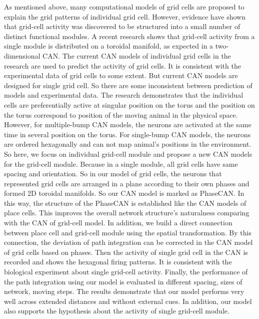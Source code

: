 \documentclass[final,5p,times,twocolumn,authoryear]{elsarticle}
\begin{document}
As mentioned above, many computational models of grid cells are proposed to explain the grid patterns of individual grid cell. However, evidence have shown that grid-cell activity was discovered to be structured into a small number of distinct functional modules\citep{Stensola2012}. A recent research shows that grid-cell activity from a single module is distributed on a toroidal manifold, as expected in a two-dimensional CAN\citep{Gardner2022}. The current CAN models\citep{Fuhs2006,Burak2009,Guanella2007} of individual grid cells in the research are used to predict the activity of grid cells. It is consistent with the experimental data of grid cells to some extent. But current CAN models are designed for single grid cell. So there are some inconsistent between prediction of models and experimental data. The research demonstrates that the individual cells are preferentially active at singular position on the torus and the position on the torus correspond to position of the moving animal in the physical space\citep{Gardner2022}. However, for multiple-bump CAN models, the neurons are activated at the same time in several position on the torus. For single-bump CAN models, the neurons are ordered hexagonally and can not map animal's positions in the environment. So here, we focus on individual grid-cell module and propose a new CAN models for the grid-cell module. Because in a single module, all grid cells have same spacing and orientation\citep{Stensola2012}. So in our model of grid cells, the neurons that represented grid cells are arranged in a plane according to their own phases and formed 2D toroidal manifolds. So our CAN model is marked as PhaseCAN. In this way, the structure of the PhaseCAN is established like the CAN models of place cells\citep{McNaughton2006}. This improves the overall network structure's naturalness comparing with the CAN of grid-cell model\citep{Guanella2007}. In addition, we build a direct connection between place cell and grid-cell module using the spatial transformation. By this connection, the deviation of path integration can be corrected in the CAN model of grid cells based on phases. Then the activity of single grid cell in the CAN is recorded and shows the hexagonal firing patterns. It is  consistent with the biological experiment about single grid-cell activity\citep{Hafting2005}. Finally, the performance of the path integration using our model is evaluated in different spacing, sizes of network, moving steps. The results demonstrate that our model performs very well across extended distances and without external cues. In addition, our model also supports the hypothesis about the activity of single grid-cell module\citep{Gardner2022}.
\end{document}
